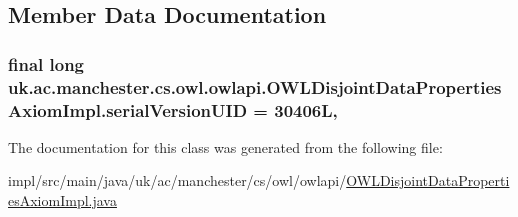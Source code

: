 \subsection{Member Data Documentation}
\hypertarget{classuk_1_1ac_1_1manchester_1_1cs_1_1owl_1_1owlapi_1_1_o_w_l_disjoint_data_properties_axiom_impl_a28d73d946f823bc7036e30a3ce145eb7}{
\subsubsection[{serial\-Version\-U\-I\-D}]{\setlength{\rightskip}{0pt plus 5cm}final long uk.\-ac.\-manchester.\-cs.\-owl.\-owlapi.\-O\-W\-L\-Disjoint\-Data\-Properties\-Axiom\-Impl.\-serial\-Version\-U\-I\-D = 30406\-L\hspace{0.3cm}{\ttfamily [static]}, {\ttfamily [private]}}}\label{classuk_1_1ac_1_1manchester_1_1cs_1_1owl_1_1owlapi_1_1_o_w_l_disjoint_data_properties_axiom_impl_a28d73d946f823bc7036e30a3ce145eb7}


The documentation for this class was generated from the following file\-:\begin{DoxyCompactItemize}
\item 
impl/src/main/java/uk/ac/manchester/cs/owl/owlapi/\hyperlink{_o_w_l_disjoint_data_properties_axiom_impl_8java}{O\-W\-L\-Disjoint\-Data\-Properties\-Axiom\-Impl.\-java}\end{DoxyCompactItemize}
